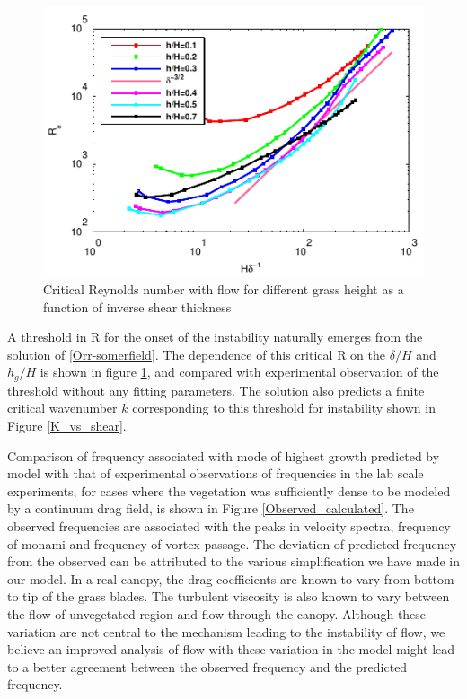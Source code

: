 \documentclass[aps,prl,twocolumn,showpacs,superscriptaddress,groupedaddress,10pt]{revtex4-1}  %
\newcommand{\hg}{h_g}
\newcommand{\Rey}{\text{R}}
\begin{document}
\begin{figure}[htb]
\includegraphics[]{Critical_Re_vs_delta}
\caption{Critical Reynolds number with flow for different grass height as a function of inverse shear thickness}
\label{Re_vs_delta}
\end{figure}
A threshold in $\Rey$ for the onset of the instability naturally emerges from the solution of \eqref{Orr-somerfield}. The dependence of this critical $\Rey$ on the $\delta/H$ and $\hg/H$ is shown in figure \ref{Re_vs_delta}, and compared with experimental observation of the threshold\cite{Ghisal02} without any fitting parameters. The solution also predicts a finite critical wavenumber $k$ corresponding to this threshold for instability shown in Figure \ref{K_vs_shear}. 

Comparison of frequency associated with mode of highest growth predicted by model with that of experimental observations of frequencies in the lab scale experiments, for cases where the vegetation was sufficiently dense to be modeled by a continuum drag field, is shown in Figure \ref{Observed_calculated}. The observed frequencies are associated with the peaks in velocity spectra, frequency of monami and frequency of vortex passage. The deviation of predicted frequency from the observed can be attributed to the various simplification we have made in our model. In a real canopy, the drag coefficients are known to
vary from bottom to tip of the grass blades\cite{Vivoni98,Nepf00}. The turbulent viscosity is also known to vary between the flow of unvegetated region and flow through the canopy. Although these variation
are not central to the mechanism leading to the instability of flow, we believe an improved analysis of flow with these variation in the model might lead to a better agreement between the
observed frequency and the predicted frequency.
\end{document}
